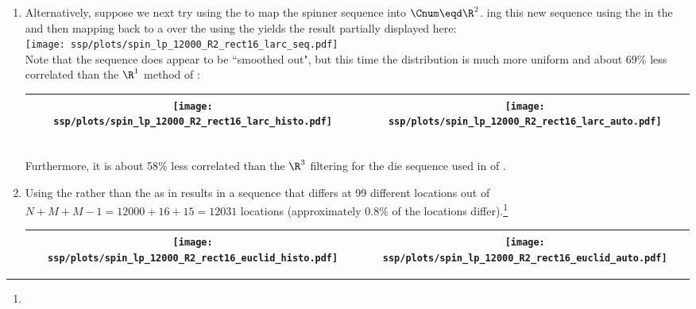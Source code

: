 \begin{example}
\begin{enumerate}
  \item \label{item:spin_lp_R2_rect16_larc}
        Alternatively, suppose we next try
        using the  
        to map the spinner sequence into $\Cnum\eqd\R^2$.
        ing this new sequence using the 
        in the  
        and then mapping back to a  over the  
        using the  yields the result partially displayed here:
        \\\texttt{[image: ssp/plots/spin\_lp\_12000\_R2\_rect16\_larc\_seq.pdf]}\\
        Note that the sequence does appear to be ``smoothed out", 
        but this time the distribution is much more uniform and about 
        69\% less correlated than the $\R^1$ method of :
        \\\begin{tabular}{|>{\scs}c|>{\scs}c|}
             \hline
             \texttt{[image: ssp/plots/spin\_lp\_12000\_R2\_rect16\_larc\_histo.pdf]}%
            &\texttt{[image: ssp/plots/spin\_lp\_12000\_R2\_rect16\_larc\_auto.pdf]}
           \\\hline
        \end{tabular}\\
        Furthermore, it is about 58\% less correlated than the $\R^3$ filtering for the die sequence
        used in  of .

  \item Using the  rather than the  as in 
        results in a sequence that differs at 99 different locations out of $N+M+M-1=12000+16+15=12031$ locations
        (approximately 0.8\% of the locations differ).\footnote{} %
        \\\begin{tabular}{|>{\scs}c|>{\scs}c|}
             \hline
             \texttt{[image: ssp/plots/spin\_lp\_12000\_R2\_rect16\_euclid\_histo.pdf]}%
            &\texttt{[image: ssp/plots/spin\_lp\_12000\_R2\_rect16\_euclid\_auto.pdf]}
           \\\hline
        \end{tabular}


\end{enumerate}
\end{example}
